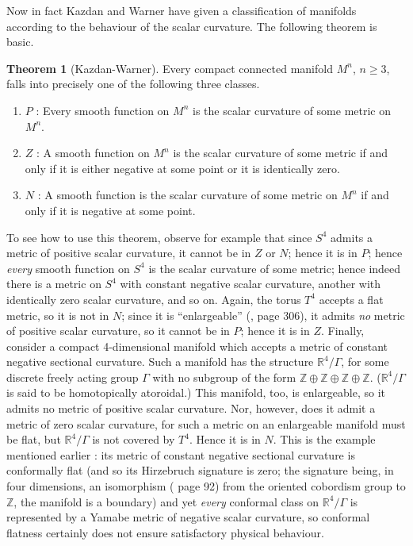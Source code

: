 \documentclass[a4paper,12pt]{article}
\newcommand{\field}[1]{\mathbb{#1}}
\newcommand{\R}{\field{R}}
\newcommand{\Z}{\field{Z}}
\theoremstyle{definition}
\newtheorem{thm}{Theorem}
\renewcommand{\u}{\textit}
\renewcommand{\-}{$\dfrac{\quad\enspace}{\quad}$}
\begin{document}
Now in fact Kazdan and Warner \cite{7} have given a classification of manifolds according to the behaviour of the scalar curvature. The following theorem is basic.
\begin{thm}[Kazdan-Warner]
Every compact connected manifold $M^n$, $n\geq 3$, falls into precisely one of the following  three classes.
\begin{enumerate}
\item $P$ : Every smooth function on $M^n$ is the scalar curvature of some metric on $M^n$.
\item $Z$ : A smooth function on $M^n$ is the scalar curvature of some metric if and only if it is either negative at some point or it is identically zero.
\item $N$ : A smooth function is the scalar curvature of some metric on $M^n$ if and only if it is negative at some point.
\end{enumerate}
\end{thm}
To see how to use this theorem, observe for example that since $S^4$ admits a metric of positive scalar curvature, it cannot be in $Z$ or $N$; hence it is in $P$; hence \u{every} smooth function on $S^4$ is the scalar curvature of some metric; hence indeed there is a metric on $S^4$ with constant negative scalar curvature, another with identically zero scalar curvature, and so on. Again, the torus $T^4$ accepts a flat metric, so it is not in $N$; since it is ``enlargeable'' (\cite{12}, page 306), it admits \u{no} metric of positive scalar curvature, so it cannot be in $P$; hence it is in $Z$. Finally, consider a compact 4-dimensional manifold which accepts a metric of constant negative sectional curvature. Such a manifold has the structure $\R^4/\Gamma$, for some discrete freely acting group $\Gamma$ with no subgroup of the form $\Z\oplus\Z\oplus\Z\oplus\Z$. ($\R^4/\Gamma$ is said to be homotopically atoroidal.) This manifold, too, is enlargeable, so it admits no metric of positive scalar curvature. Nor, however, does it admit a metric of zero scalar curvature, for such a metric on an enlargeable manifold must be flat, but $\R^4/\Gamma$ is not covered by $T^4$. Hence it is in $N$. This is the example mentioned earlier : its metric of constant negative sectional curvature is conformally flat (and so its Hirzebruch signature is zero; the signature being, in four dimensions, an isomorphism (\cite{12} page 92) from the oriented cobordism group to $\Z$, the manifold is a boundary) and yet \u{every} conformal class on $\R^4/\Gamma$ is represented by a Yamabe metric of negative scalar curvature, so conformal flatness certainly does not ensure satisfactory physical behaviour.
\end{document}
